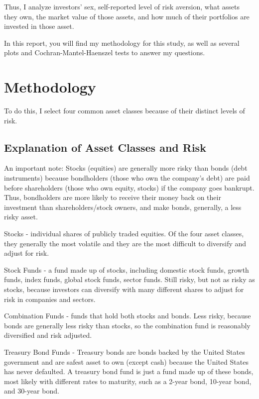 \documentclass[
]{article}
\begin{document}
Thus, I analyze investors' sex, self-reported level of risk aversion,
what assets they own, the market value of those assets, and how much of
their portfolios are invested in those asset.

In this report, you will find my methodology for this study, as well as
several plots and Cochran-Mantel-Haenszel tests to answer my questions.

\hypertarget{methodology}{%
\section{Methodology}\label{methodology}}

To do this, I select four common asset classes because of their distinct
levels of risk.

\hypertarget{explanation-of-asset-classes-and-risk}{%
\subsection{Explanation of Asset Classes and
Risk}\label{explanation-of-asset-classes-and-risk}}

An important note: Stocks (equities) are generally more risky than bonds
(debt instruments) because bondholders (those who own the company's
debt) are paid before shareholders (those who own equity, stocks) if the
company goes bankrupt. Thus, bondholders are more likely to receive
their money back on their investment than shareholders/stock owners, and
make bonds, generally, a less risky asset.

Stocks - individual shares of publicly traded equities. Of the four
asset classes, they generally the most volatile and they are the most
difficult to diversify and adjust for risk.

Stock Funds - a fund made up of stocks, including domestic stock funds,
growth funds, index funds, global stock funds, sector funds. Still
risky, but not as risky as stocks, because investors can diversify with
many different shares to adjust for risk in companies and sectors.

Combination Funds - funds that hold both stocks and bonds. Less risky,
because bonds are generally less risky than stocks, so the combination
fund is reasonably diversified and risk adjusted.

Treasury Bond Funds - Treasury bonds are bonds backed by the United
States government and are safest asset to own (except cash) because the
United States has never defaulted. A treasury bond fund is just a fund
made up of these bonds, most likely with different rates to maturity,
such as a 2-year bond, 10-year bond, and 30-year bond.
\end{document}
